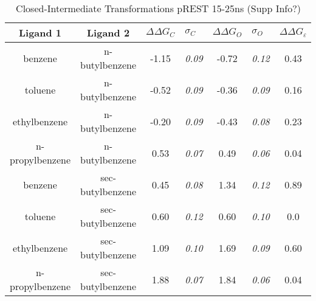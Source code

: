 \documentclass[T4paper.tex]{subfiles}
\begin{document}
\begin{table}[!htb]
\centering
\caption{Closed-Intermediate Transformations pREST 15-25ns (Supp Info?)}
\label{tbl:C-I_pRESText}
\begin{tabular}{|c|c|c|l|c|l|c|}
\hline
\textbf{Ligand 1}       & \textbf{Ligand 2}    & {\color[HTML]{800080} \boldmath$\Delta\Delta G_{C}$} & {\color[HTML]{800080} \boldmath$\sigma_{C}$} & {\color[HTML]{008000} \boldmath$\Delta\Delta G_{O}$} & {\color[HTML]{008000} \boldmath$\sigma_{O}$} & \boldmath$\Delta\Delta G_{\varepsilon}$ \\ \hline
\cellcolor[HTML]{800080}benzene         & \cellcolor[HTML]{00FFFF}n-butylbenzene   & -1.15                                   & \textit{0.09}                       & -0.72                                & \textit{0.12}                       & \cellcolor[HTML]{9AFF99}0.43 \\ \hline
\cellcolor[HTML]{800080}toluene         & \cellcolor[HTML]{00FFFF}n-butylbenzene   & -0.52                                  & \textit{0.09}                       & -0.36                                & \textit{0.09}                       & \cellcolor[HTML]{9AFF99}0.16 \\ \hline
\cellcolor[HTML]{800080}ethylbenzene    & \cellcolor[HTML]{00FFFF}n-butylbenzene   & -0.20                                   & \textit{0.09}                       & -0.43                                & \textit{0.08}                       & \cellcolor[HTML]{9AFF99}0.23 \\ \hline
\cellcolor[HTML]{800080}n-propylbenzene & \cellcolor[HTML]{00FFFF}n-butylbenzene   & 0.53                                  & \textit{0.07}                       & 0.49                                 & \textit{0.06}                       & \cellcolor[HTML]{9AFF99}0.04 \\ \hline
\cellcolor[HTML]{800080}benzene         & \cellcolor[HTML]{00FFFF}sec-butylbenzene & 0.45                                   & \textit{0.08}                       & 1.34                                 & \textit{0.12}                       & \cellcolor[HTML]{9AFF99}0.89 \\ \hline
\cellcolor[HTML]{800080}toluene         & \cellcolor[HTML]{00FFFF}sec-butylbenzene & 0.60                                   & \textit{0.12}                       & 0.60                                 & \textit{0.10}                       & \cellcolor[HTML]{9AFF99}0.0 \\ \hline
\cellcolor[HTML]{800080}ethylbenzene    & \cellcolor[HTML]{00FFFF}sec-butylbenzene & 1.09                                   & \textit{0.10}                       & 1.69                                 & \textit{0.09}                       & \cellcolor[HTML]{9AFF99}0.60 \\ \hline
\cellcolor[HTML]{800080}n-propylbenzene & \cellcolor[HTML]{00FFFF}sec-butylbenzene & 1.88                                   & \textit{0.07}                       & 1.84                                 & \textit{0.06}                       & \cellcolor[HTML]{9AFF99}0.04 \\ \hline
\end{tabular}
\end{table}
\end{document}
